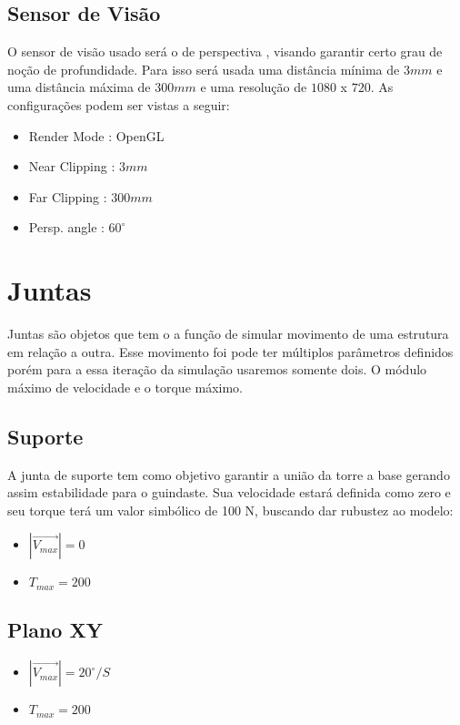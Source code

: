 \documentclass[letterpaper, 10 pt]{ieeeconf}  %
\begin{document}
        \subsection{Sensor de Visão}
            O sensor de visão usado será o de perspectiva , visando garantir certo grau de noção de profundidade. Para isso será usada uma distância mínima de \(3mm\)
            e uma distância máxima de \(300mm\) e uma resolução de \(1080\) x \(720\). As configurações podem ser vistas a seguir:
            \begin{itemize}
                \item Render Mode : OpenGL 
                \item Near Clipping : \(3mm\)
                \item Far Clipping : \(300mm\)
                \item Persp. angle : \(60^{\circ}\)
            \end{itemize}
        
    \section{Juntas}
        Juntas são objetos que tem o a função de simular movimento de uma estrutura em relação a outra. Esse movimento foi
        pode ter múltiplos parâmetros definidos porém para a essa iteração da simulação usaremos somente dois. O módulo máximo 
        de velocidade e o torque máximo.
        \subsection{Suporte}
            A junta de suporte tem como objetivo garantir a união da torre a base gerando assim estabilidade para o guindaste. Sua velocidade estará definida como zero e seu torque
            terá um valor simbólico de 100 N, buscando dar rubustez ao modelo:
            \begin{itemize}
                \item \(\left|\vec{V_{max}}\right| = 0\)
                \item \(T_{max} = 200\)
            \end{itemize}
        \subsection{Plano XY}
            \begin{itemize}
                \item \(\left|\vec{V_{max}}\right| = 20^{\circ}/S\)
                \item \(T_{max} = 200\)
            \end{itemize}
\end{document}
